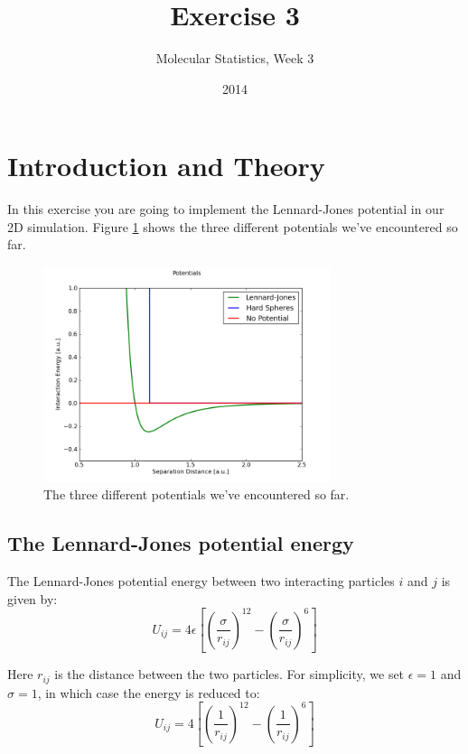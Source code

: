 \documentclass{article}
\title{Exercise 3}
\author{Molecular Statistics, Week 3}
\date{2014}
\begin{document}

\maketitle


\section{Introduction and Theory}

In this exercise you are going to implement the Lennard-Jones potential in our 2D simulation.
Figure \ref{fig:potentials} shows the three different potentials we've encountered so far.

\begin{figure}[h!]
\begin{center}
    \includegraphics[width=0.75\textwidth]{potentials.png}
    \caption{The three different potentials we've encountered so far.}
    \label{fig:potentials}
\end{center}
\end{figure}


\subsection{The Lennard-Jones potential energy}

The Lennard-Jones potential energy between two interacting particles $i$ and $j$ is given by:
\begin{equation}
    U_{ij} = 4 \epsilon \left[ \left(\frac{\sigma}{r_{ij}} \right)^{12} - \left(\frac{\sigma}{r_{ij}} \right)^6 \right]
\end{equation}

Here $r_{ij}$ is the distance between the two particles.
For simplicity, we set $\epsilon = 1$ and $\sigma = 1$, in which case the energy is reduced to:
\begin{equation}
    U_{ij} = 4 \left[ \left(\frac{1}{r_{ij}} \right)^{12} - \left(\frac{1}{r_{ij}} \right)^6 \right]
\end{equation}
\end{document}
